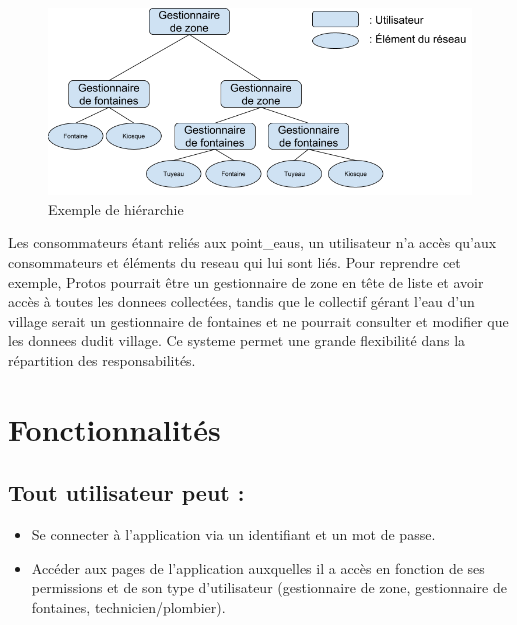 \documentclass[a4paper, 11pt]{article}
\begin{document}
    \begin{figure}[H]
      \centering
      \includegraphics[width=.8\textwidth]{Cahier_des_Charges/principe_hierarchique}
      \caption{Exemple de hiérarchie}
      \label{fig:hierarchie}
    \end{figure}

    Les \glspl{consommateur} étant reliés aux \glspl{point_eau}, un \gls{utilisateur} n'a accès qu'aux \glspl{consommateur} et éléments du \gls{reseau} qui lui sont liés. Pour reprendre cet exemple, Protos pourrait être un gestionnaire de \gls{zone} en tête de liste et avoir accès à toutes les \glspl{donnee} collectées, tandis que le collectif gérant l'eau d'un village serait un gestionnaire de \glspl{fontaine} et ne pourrait consulter et modifier que les \glspl{donnee} dudit village. Ce \gls{systeme} permet une grande flexibilité dans la répartition des responsabilités.
\section{Fonctionnalités}

\subsection{Tout \gls{utilisateur} peut :}
\begin{itemize}
  \item Se connecter à l'\gls{application} via un identifiant et un mot de passe.
  \item Accéder aux pages de l'\gls{application} auxquelles il a accès en fonction de ses \glspl{permission} et de son type d'\gls{utilisateur} (gestionnaire de \gls{zone}, gestionnaire de \glspl{fontaine}, technicien/plombier).
\end{itemize}
\end{document}
